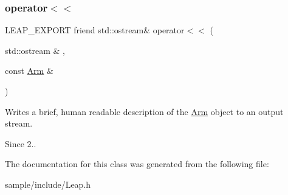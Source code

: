 \subsubsection{\texorpdfstring{operator$<$$<$}{operator<<}}
{\footnotesize\ttfamily L\+E\+A\+P\+\_\+\+E\+X\+P\+O\+RT friend std\+::ostream\& operator$<$$<$ (\begin{DoxyParamCaption}\item[{std\+::ostream \&}]{,  }\item[{const \hyperlink{class_leap_1_1_arm}{Arm} \&}]{ }\end{DoxyParamCaption})\hspace{0.3cm}{\ttfamily [friend]}}

Writes a brief, human readable description of the \hyperlink{class_leap_1_1_arm}{Arm} object to an output stream.


\begin{DoxyCodeInclude}
\end{DoxyCodeInclude}


\begin{DoxySince}{Since}
2.. 
\end{DoxySince}


The documentation for this class was generated from the following file\+:\begin{DoxyCompactItemize}
\item 
sample/include/Leap.\+h\end{DoxyCompactItemize}
